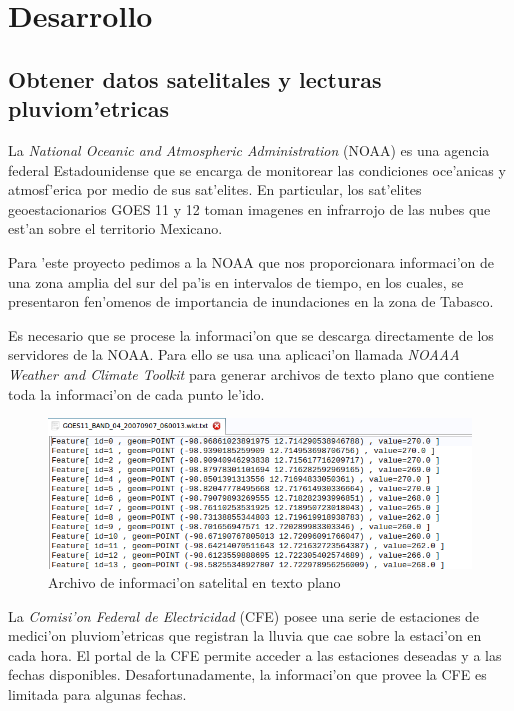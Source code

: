 \chapter{Desarrollo}

\section{Obtener datos satelitales y lecturas \\ pluviom'etricas}

  La  \textit{National Oceanic and Atmospheric Administration} (NOAA) es una agencia federal Estadounidense que se encarga de 
  monitorear las condiciones oce'anicas y atmosf'erica por medio de sus sat'elites.
  En particular, los sat'elites geoestacionarios GOES 11 y 12 toman imagenes en infrarrojo de las nubes que est'an sobre
  el territorio Mexicano.

  Para 'este proyecto pedimos a la NOAA que nos proporcionara informaci'on de una zona amplia del sur del pa'is en 
  intervalos de tiempo, en los cuales, se presentaron fen'omenos de importancia de inundaciones en la zona de Tabasco.

  Es necesario que se procese la informaci'on que se descarga directamente de los servidores de la NOAA. Para ello se usa
  una aplicaci'on llamada \textit{NOAAA Weather and Climate Toolkit} para generar archivos de texto plano que contiene
  toda la informaci'on de cada punto le'ido.

  \begin{figure}[h!]
  \centering
  \includegraphics[width=150mm]{./imagenes/archivoTxt.png}
  \caption{Archivo de informaci'on satelital en texto plano}
  \end{figure}


  La \textit{Comisi'on Federal de Electricidad} (CFE) posee una serie de estaciones de medici'on pluviom'etricas que registran 
  la lluvia que cae sobre la estaci'on en cada hora. El portal de la CFE permite acceder a las estaciones deseadas 
  y a las fechas disponibles. Desafortunadamente, la informaci'on que provee la CFE es limitada para algunas fechas.




